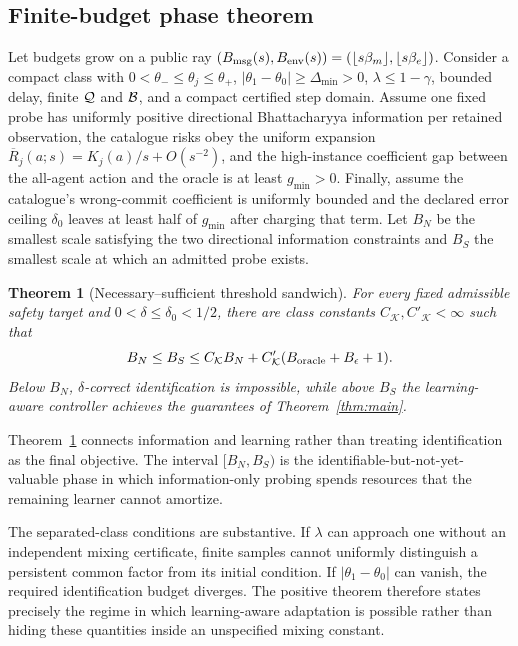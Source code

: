 \documentclass[journal]{IEEEtran}
\newtheorem{theorem}{Theorem}
\begin{document}
\subsection{Finite-budget phase theorem}
Let budgets grow on a public ray $(B_{\rm msg}(s),B_{\rm env}(s))=(\lfloor s\beta_m\rfloor,\lfloor s\beta_e\rfloor)$.
Consider a compact class with $0<\theta_-\le\theta_j\le\theta_+$, $|\theta_1-\theta_0|\ge\Delta_{\min}>0$, $\lambda\le1-\gamma$, bounded delay, finite ${\cal Q}$ and ${\cal B}$, and a compact certified step domain.
Assume one fixed probe has uniformly positive directional Bhattacharyya information per retained observation, the catalogue risks obey the uniform expansion $\overline R_j(a;s)=K_j(a)/s+O(s^{-2})$, and the high-instance coefficient gap between the all-agent action and the oracle is at least $g_{\min}>0$.
Finally, assume the catalogue's wrong-commit coefficient is uniformly bounded and the declared error ceiling $\delta_0$ leaves at least half of $g_{\min}$ after charging that term.
Let $B_N$ be the smallest scale satisfying the two directional information constraints and $B_S$ the smallest scale at which an admitted probe exists.

\begin{theorem}[Necessary--sufficient threshold sandwich]
For every fixed admissible safety target and $0<\delta\le\delta_0<1/2$, there are class constants $C_{\mathcal K},C'_{\mathcal K}<\infty$ such that
\begin{equation}
B_N\le B_S\le C_{\mathcal K}B_N+C'_{\mathcal K}(B_{\rm oracle}+B_\epsilon+1).
\label{eq:threshold-sandwich}
\end{equation}
Below $B_N$, $\delta$-correct identification is impossible, while above $B_S$ the learning-aware controller achieves the guarantees of Theorem~\ref{thm:main}.
\label{thm:sandwich}
\end{theorem}
Theorem~\ref{thm:sandwich} connects information and learning rather than treating identification as the final objective.
The interval $[B_N,B_S)$ is the identifiable-but-not-yet-valuable phase in which information-only probing spends resources that the remaining learner cannot amortize.

The separated-class conditions are substantive.
If $\lambda$ can approach one without an independent mixing certificate, finite samples cannot uniformly distinguish a persistent common factor from its initial condition.
If $|\theta_1-\theta_0|$ can vanish, the required identification budget diverges.
The positive theorem therefore states precisely the regime in which learning-aware adaptation is possible rather than hiding these quantities inside an unspecified mixing constant.
\end{document}
